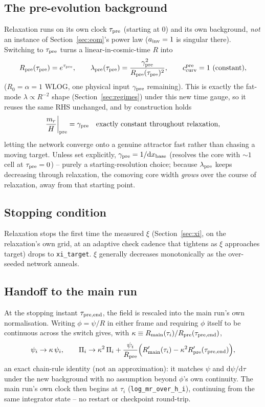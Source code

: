 \documentclass[11pt]{article}
\newcommand{\psivec}{\psi}
\begin{document}
\subsection{The pre-evolution background}
Relaxation runs on its own clock $\tau_{\rm pre}$ (starting at 0) and its own background, \emph{not} an
instance of Section~\ref{sec:eom}'s power law ($a_{\rm inv}=1$ is singular there). Switching to
$\tau_{\rm pre}$ turns a linear-in-cosmic-time $R$ into
\[
R_{\rm pre}(\tau_{\rm pre}) = e^{\tau_{\rm pre}}, \qquad
\lambda_{\rm pre}(\tau_{\rm pre}) = \frac{\gamma_{\rm pre}^2}{R_{\rm pre}(\tau_{\rm pre})^2}, \qquad
c_{\rm curv}^{\rm pre} = 1\ \text{(constant)},
\]
($R_0=\alpha=1$ WLOG, one physical input $\gamma_{\rm pre}$ remaining). This is exactly the fat-mode
$\lambda\propto R^{-2}$ shape (Section~\ref{sec:regimes}) under this new time gauge, so it reuses the same
RHS unchanged, and by construction holds
\[
\frac{m_r}{H}\bigg|_{\rm pre} = \gamma_{\rm pre} \quad \text{exactly constant throughout relaxation},
\]
letting the network converge onto a genuine attractor fast rather than chasing a moving target. Unless set
explicitly, $\gamma_{\rm pre} = 1/\mathrm{d}x_{\rm base}$ (resolves the core with $\sim\!1$ cell at
$\tau_{\rm pre}=0$) -- purely a starting-resolution choice; because $\lambda_{\rm pre}$ keeps decreasing
through relaxation, the comoving core width \emph{grows} over the course of relaxation, away from that
starting point.

\subsection{Stopping condition}
Relaxation stops the first time the measured $\xi$ (Section~\ref{sec:xi}, on the relaxation's own grid, at
an adaptive check cadence that tightens as $\xi$ approaches target) drops to \texttt{xi\_target}. $\xi$
generally decreases monotonically as the over-seeded network anneals.

\subsection{Handoff to the main run}
At the stopping instant $\tau_{\rm pre,end}$, the field is rescaled into the main run's own normalisation.
Writing $\phi=\psivec/R$ in either frame and requiring $\phi$ itself to be continuous across the switch
gives, with $\kappa \equiv R_{\rm main}(\tau_i)/R_{\rm pre}(\tau_{\rm pre,end})$,
\[
\psivec_i \to \kappa\,\psivec_i, \qquad
\Pi_i \to \kappa^2\,\Pi_i + \frac{\psivec_i}{R_{\rm pre}}\Big(R_{\rm main}'(\tau_i) - \kappa^2
R_{\rm pre}'(\tau_{\rm pre,end})\Big),
\]
an exact chain-rule identity (not an approximation): it matches $\psivec$ and $\mathrm{d}\psivec/\mathrm{d}\tau$
under the new background with no assumption beyond $\phi$'s own continuity. The main run's own clock then
begins at $\tau_i$ (\texttt{log\_mr\_over\_h\_i}), continuing from the same integrator state -- no restart
or checkpoint round-trip.
\end{document}
